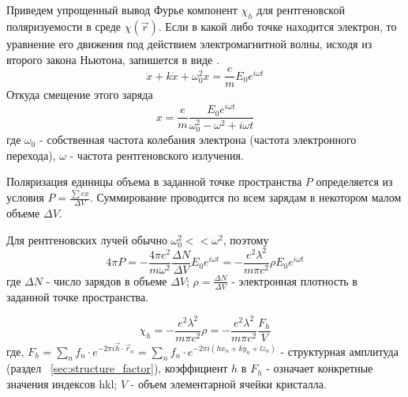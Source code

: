 \begin{center}
  \section{ }%
  \label{sec:polarizability}
\end{center}

Приведем упрощенный вывод Фурье компонент  $\chi_h$  для рентгеновской
поляризуемости в среде  $\chi(\vec{r})$. Если в какой либо точке находится электрон,
то уравнение его движения под действием электромагнитной волны,
исходя из второго закона Ньютона, запишется в виде \cite{iveronova1972}.
\begin{equation}
  \ddot{x}+ k\dot{x} + \omega_0^2 x = \frac{e}{m}E_0e^{i\omega t}
 \end{equation}
Откуда смещение этого заряда
\begin{equation}
  x = \frac{e}{m} \frac{E_0e^{i\omega t}}{\omega_0^2 - \omega^2+i\omega t}
 \end{equation}
где $\omega_0 $ - собственная частота колебания электрона (частота электронного перехода), $\omega$ - частота рентгеновского излучения.

Поляризация единицы объема в заданной точке пространства $P$ определяется из условия
$P = \frac{\sum e x}{\Delta V}$. Суммирование проводится по всем зарядам в
некотором малом объеме  $\Delta V$.

Для рентгеновских лучей обычно $\omega_0^2 << \omega^2$, поэтому
\begin{equation}
  4\pi P = - \frac{4\pi e^2}{m\omega^2}\frac{\Delta N}{\Delta V} E_0 e^{i\omega t} = -\frac{e^2 \lambda^2}{m \pi c^2} \rho E_0 e^{i\omega t}
 \end{equation}
где $\Delta N$ - число зарядов в объеме $\Delta V$;
$\rho = \frac{\Delta N}{\Delta V}$ - электронная плотность в заданной точке пространства.


\begin{equation}
  \chi_h = -\frac{e^2 \lambda^2}{m \pi c^2}  \rho = -\frac{e^2 \lambda^2}{m \pi c^2} \frac{F_h}{V}
 \end{equation}
 где, $ F_h = \sum_{n} f_n \cdot e^{-2\pi i\vec{h}\cdot \vec{r}_n}= \sum_{n} f_n \cdot e^{- 2 \pi i (hx_n+ky_n+lz_n)}$ -
 структурная амплитуда (раздел ~\ref{sec:structure_factor}),
 коэффициент $h$ в $F_h$ - означает конкретные значения индексов {hkl}; $V$ - объем элементарной ячейки кристалла.

\newpage
\begin{center}
\section{ }%
\label{sec:wave_equation}
\end{center}


